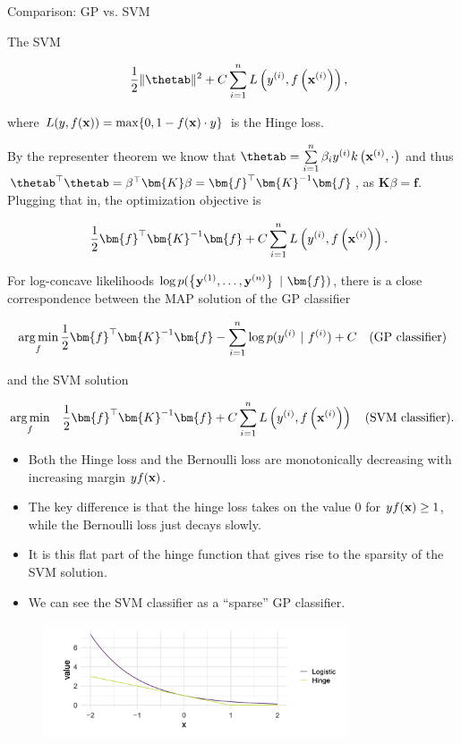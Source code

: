 \begin{vbframe}{Comparison: GP vs. SVM }

The SVM 

\begin{eqnarray*}
  && \frac{1}{2} \|\thetab\|^2 + C \sumin \Lxyi, \\
\end{eqnarray*}

where $L(y, f(\mathbf{x})) = \max\{0, 1-f(\mathbf{x})\cdot y\}$ is the Hinge loss. 

\lz 

By the representer theorem we know that $\thetab = \sumin \beta_i \yi k\left(\xi, \cdot \right)$ and thus $\thetab^\top \thetab = \beta^\top \bm{K} \beta = \bm{f}^\top \bm{K}^{-1} \bm{f}$, as $\bm{K} \beta = \bm{f}$. Plugging that in, the optimization objective is

\begin{eqnarray*}
  && \frac{1}{2} \bm{f}^\top \bm{K}^{-1} \bm{f} + C \sumin \Lxyi. 
\end{eqnarray*}

\framebreak  

For log-concave likelihoods $\log p(\ydat ~|~ \bm{f})$, there is a close correspondence between the MAP solution of the GP classifier

$$
  \argmin_f \frac{1}{2} \bm{f}^\top \bm{K}^{-1} \bm{f} - \sumin \log p(\yi ~|~ f^{(i)}) + C \quad \text{(GP classifier)}
$$

and the SVM solution

\begin{eqnarray*}
  \argmin_f && \frac{1}{2} \bm{f}^\top \bm{K}^{-1} \bm{f} + C \sumin \Lxyi \quad \text{(SVM classifier)}. 
\end{eqnarray*}

\framebreak 

\begin{itemize}
\item Both the Hinge loss and the Bernoulli loss are monotonically decreasing with increasing margin $y f(\mathbf{x})$. 
\item The key difference is that the hinge loss takes on the value $0$ for $y f(\mathbf{x}) \ge 1$, while the Bernoulli loss just decays slowly. 
\item It is this flat part of the hinge function that gives rise to the sparsity of the SVM solution. \item We can see the SVM classifier as a \enquote{sparse} GP classifier.  
\end{itemize}

\begin{figure}
\includegraphics[width=0.8\textwidth]{figure_man/gp-vs-svm.png}
\end{figure}

\end{vbframe}

\endlecture
